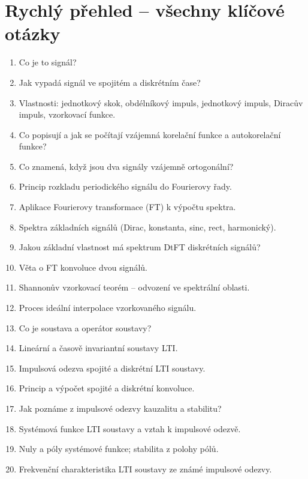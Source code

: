 \documentclass[12pt,a4paper]{article}
\begin{document}
\section*{Rychlý přehled – všechny klíčové otázky}
\begin{tcolorbox}[colback=cervena!8,colframe=cervena,
    title={\bfseries\color{white} Seznam všech $\bigstar$ otázek (29)},
    fonttitle=\large]
\begin{enumerate}[itemsep=4pt]
  \item Co je to signál?
  \item Jak vypadá signál ve spojitém a diskrétním čase?
  \item Vlastnosti: jednotkový skok, obdélníkový impuls, jednotkový impuls, Diracův impuls, vzorkovací funkce.
  \item Co popisují a jak se počítají vzájemná korelační funkce a autokorelační funkce?
  \item Co znamená, když jsou dva signály vzájemně ortogonální?
  \item Princip rozkladu periodického signálu do Fourierovy řady.
  \item Aplikace Fourierovy transformace (FT) k výpočtu spektra.
  \item Spektra základních signálů (Dirac, konstanta, sinc, rect, harmonický).
  \item Jakou základní vlastnost má spektrum DtFT diskrétních signálů?
  \item Věta o FT konvoluce dvou signálů.
  \item Shannonův vzorkovací teorém – odvození ve spektrální oblasti.
  \item Proces ideální interpolace vzorkovaného signálu.
  \item Co je soustava a operátor soustavy?
  \item Lineární a časově invariantní soustavy LTI.
  \item Impulsová odezva spojité a diskrétní LTI soustavy.
  \item Princip a výpočet spojité a diskrétní konvoluce.
  \item Jak poznáme z impulsové odezvy kauzalitu a stabilitu?
  \item Systémová funkce LTI soustavy a vztah k impulsové odezvě.
  \item Nuly a póly systémové funkce; stabilita z polohy pólů.
  \item Frekvenční charakteristika LTI soustavy ze známé impulsové odezvy.

\end{enumerate}
\end{tcolorbox}
\end{document}
